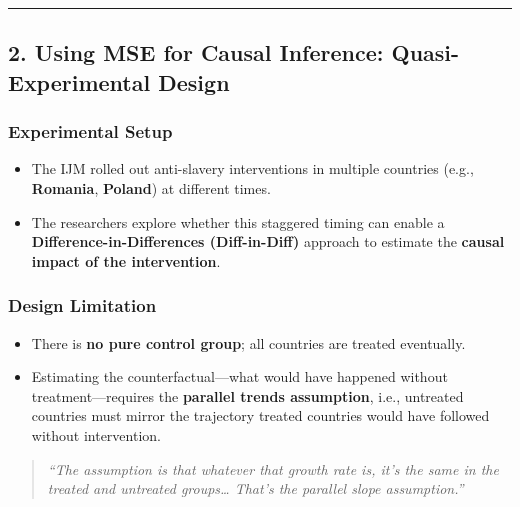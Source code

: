 \documentclass[
  12pt,
]{article}
\theoremstyle{plain}
\theoremstyle{definition}
\begin{document}
\begin{center}\rule{0.5\linewidth}{0.5pt}\end{center}

\subsection{\texorpdfstring{\textbf{2. Using MSE for Causal Inference:
Quasi-Experimental
Design}}{2. Using MSE for Causal Inference: Quasi-Experimental Design}}\label{using-mse-for-causal-inference-quasi-experimental-design}

\subsubsection{\texorpdfstring{\textbf{Experimental
Setup}}{Experimental Setup}}\label{experimental-setup}

\begin{itemize}
\item
  The IJM rolled out anti-slavery interventions in multiple countries
  (e.g., \textbf{Romania}, \textbf{Poland}) at different times.
\item
  The researchers explore whether this staggered timing can enable a
  \textbf{Difference-in-Differences (Diff-in-Diff)} approach to estimate
  the \textbf{causal impact of the intervention}.
\end{itemize}

\subsubsection{\texorpdfstring{\textbf{Design
Limitation}}{Design Limitation}}\label{design-limitation}

\begin{itemize}
\item
  There is \textbf{no pure control group}; all countries are treated
  eventually.
\item
  Estimating the counterfactual---what would have happened without
  treatment---requires the \textbf{parallel trends assumption}, i.e.,
  untreated countries must mirror the trajectory treated countries would
  have followed without intervention.
\end{itemize}

\begin{quote}
\emph{``The assumption is that whatever that growth rate is, it's the
same in the treated and untreated groups\ldots{} That's the parallel
slope assumption.''}
\end{quote}
\end{document}
